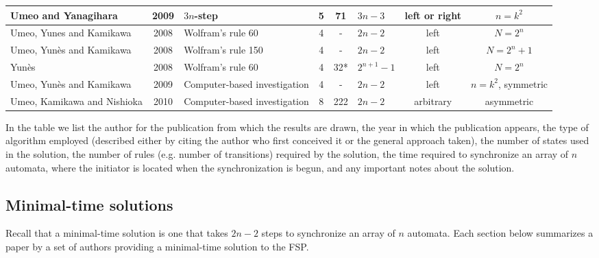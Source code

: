 \documentclass{article}
\begin{document}
\begin{table}[H]
\begin{tabular}{|>{\centering\arraybackslash}p{2.0cm}|c|>{\centering\arraybackslash}p{2.0cm}|c|c|>{\centering\arraybackslash}p{1.8cm}|c|c|}
Umeo and Yanagihara \cite{umeo2009small} & 2009 & $3n$-step & 5 & 71 & $3n-3$ & left or right & $n=k^2$\\ \hline

Umeo, Yunes and Kamikawa \cite{umeo20084} & 2008 & Wolfram's rule 60 & 4 & - & $2n - 2$ & left & $N=2^n$\\ \hline

Umeo, Yun\`{e}s and Kamikawa \cite{umeo20084} & 2008 & Wolfram's rule 150 & 4 & - & $2n-2$ & left & $N=2^n+1$\\ \hline

Yun\`{e}s \cite{yunes20084} & 2008 & Wolfram's rule 60 & 4 & 32* & $2^{n+1}-1$ & left & $N=2^n$\\ \hline

Umeo, Yun\`{e}s and Kamikawa \cite{umeo2009family} & 2009 & Computer-based investigation  & 4 & - & $2n - 2$ & left & $n=k^2$, symmetric\\ \hline

Umeo, Kamikawa and Nishioka \cite{umeo2010generalized} & 2010 & Computer-based investigation & 8 & 222 & $2n - 2$ & arbitrary & asymmetric \\ \hline


\end{tabular}
\end{table}

In the table we list the author for the publication from which the results are drawn, the year in which the publication appears, the type of algorithm employed (described either by citing the author who first conceived it or the general approach taken), the number of states used in the solution, the number of rules (e.g. number of transitions) required by the solution, the time required to synchronize an array of $n$ automata, where the initiator is located when the synchronization is begun, and any important notes about the solution.

\subsection{Minimal-time solutions}
Recall that a minimal-time solution is one that takes $2n-2$ steps to synchronize an array of $n$ automata. Each section below summarizes a paper by a set of authors providing a minimal-time solution to the FSP.
\end{document}
